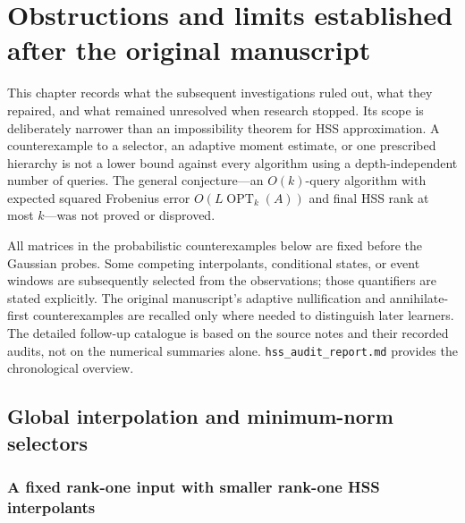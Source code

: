 \documentclass[11pt,oneside,openany,a4paper]{report}
\numberwithin{equation}{chapter}
\theoremstyle{definition}
\theoremstyle{remark}
\newcommand{\sourcefile}[1]{{\small\nolinkurl{#1}}}
\begin{document}
\chapter{Obstructions and limits established after the original manuscript}
\label{chap:later-obstructions}

This chapter records what the subsequent investigations ruled out, what
they repaired, and what remained unresolved when research stopped.  Its
scope is deliberately narrower than an impossibility theorem for HSS
approximation.  A counterexample to a selector, an adaptive moment
estimate, or one prescribed hierarchy is not a lower bound against every
algorithm using a depth-independent number of queries.  The general
conjecture---an $O(k)$-query algorithm with expected squared Frobenius
error $O(L\operatorname{OPT}_k(A))$ and final HSS rank at most $k$---was
not proved or disproved.

All matrices in the probabilistic counterexamples below are fixed before
the Gaussian probes.  Some competing interpolants, conditional states,
or event windows are subsequently selected from the observations; those
quantifiers are stated explicitly.  The original manuscript's adaptive
nullification and annihilate-first counterexamples are recalled only
where needed to distinguish later learners.  The detailed follow-up
catalogue is based on the source notes and their recorded audits, not
on the numerical summaries alone.  \sourcefile{hss_audit_report.md}
provides the chronological overview.

\section{Global interpolation and minimum-norm selectors}
\label{sec:later-global-selectors}

\subsection{A fixed rank-one input with smaller rank-one HSS interpolants}
\end{document}
